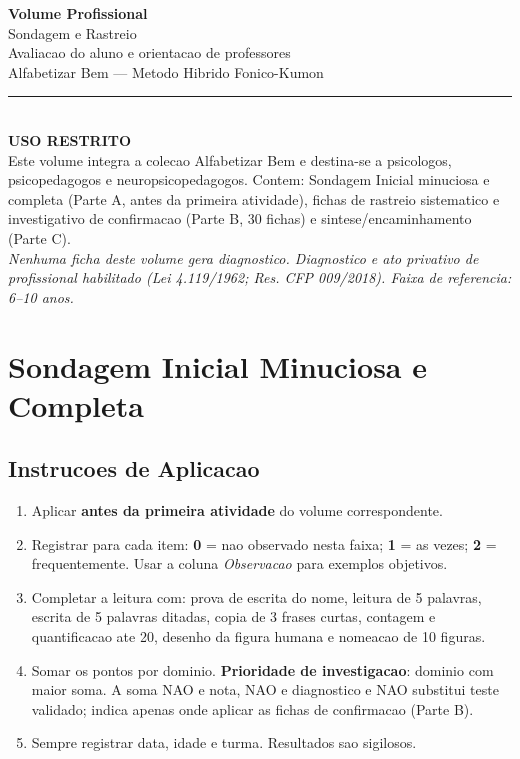 \documentclass[a4paper,11pt]{book}
\begin{document}
\frontmatter
\begin{titlepage}
\begin{center}
\vspace*{1.5cm}
{\Huge\bfseries Volume Profissional}\\[0.7cm]
{\LARGE Sondagem e Rastreio}\\[0.5cm]
{\large Avaliacao do aluno e orientacao de professores}\\[1.2cm]
{\large Alfabetizar Bem --- Metodo Hibrido Fonico-Kumon}\\[2.2cm]
\noindent\rule{9cm}{0.6pt}\\[0.8cm]
{\normalsize\bfseries USO RESTRITO}\\[0.3cm]
{\small Este volume integra a colecao Alfabetizar Bem e destina-se a
psicologos, psicopedagogos e neuropsicopedagogos. Contem: Sondagem Inicial
minuciosa e completa (Parte A, antes da primeira atividade), fichas de
rastreio sistematico e investigativo de confirmacao (Parte B, 30 fichas) e
sintese/encaminhamento (Parte C).}\\[0.6cm]
{\small\itshape Nenhuma ficha deste volume gera diagnostico. Diagnostico e ato
privativo de profissional habilitado (Lei 4.119/1962; Res. CFP 009/2018).
Faixa de referencia: 6--10 anos.}
\end{center}
\end{titlepage}

\tableofcontents
\clearpage
\mainmatter

\chapter{Sondagem Inicial Minuciosa e Completa}

\section{Instrucoes de Aplicacao}

\begin{enumerate}[leftmargin=2.2em]
\item Aplicar \textbf{antes da primeira atividade} do volume correspondente.
\item Registrar para cada item: \textbf{0} = nao observado nesta faixa;
\textbf{1} = as vezes; \textbf{2} = frequentemente. Usar a coluna
\textit{Observacao} para exemplos objetivos.
\item Completar a leitura com: prova de escrita do nome, leitura de 5 palavras,
escrita de 5 palavras ditadas, copia de 3 frases curtas, contagem e
quantificacao ate 20, desenho da figura humana e nomeacao de 10 figuras.
\item Somar os pontos por dominio. \textbf{Prioridade de investigacao}:
dominio com maior soma. A soma NAO e nota, NAO e diagnostico e NAO substitui
teste validado; indica apenas onde aplicar as fichas de confirmacao (Parte B).
\item Sempre registrar data, idade e turma. Resultados sao sigilosos.
\end{enumerate}
\end{document}
